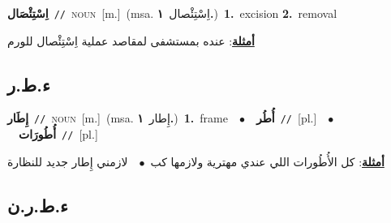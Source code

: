 \documentclass[10pt,a4paper,twoside]{article} %
\begin{document}
\begin{multicols}{2}
{\setlength\topsep{0pt}\textbf{\foreignlanguage{arabic}{اِسْتِئْصَال}}\ {\color{gray}\texttt{//}\color{black}}\ \textsc{noun}\ [m.]\ \color{gray}(msa. \foreignlanguage{arabic}{اِسْتِئْصال}~\foreignlanguage{arabic}{\textbf{١.}})\color{black}\ \textbf{1.}~excision  \textbf{2.}~removal\  \begin{flushright}\color{gray}\foreignlanguage{arabic}{\textbf{\underline{\foreignlanguage{arabic}{أمثلة}}}: عنده بمستشفى لمقاصد عملية اِسْتِئْصال للورم}\end{flushright}\color{black}} \vspace{2mm}

\vspace{-3mm}
\subsection*{\color{blue}\foreignlanguage{arabic}{ء.ط.ر}\color{blue}{}} 

{\setlength\topsep{0pt}\textbf{\foreignlanguage{arabic}{إِطَار}}\ {\color{gray}\texttt{//}\color{black}}\ \textsc{noun}\ [m.]\ \color{gray}(msa. \foreignlanguage{arabic}{إِطار}~\foreignlanguage{arabic}{\textbf{١.}})\color{black}\ \textbf{1.}~frame\ \ $\bullet$\ \ \setlength\topsep{0pt}\textbf{\foreignlanguage{arabic}{أُطُر}}\ {\color{gray}\texttt{//}\color{black}}\ [pl.]\ \ $\bullet$\ \ \setlength\topsep{0pt}\textbf{\foreignlanguage{arabic}{أُطُورَات}}\ {\color{gray}\texttt{//}\color{black}}\ [pl.]\  \begin{flushright}\color{gray}\foreignlanguage{arabic}{\textbf{\underline{\foreignlanguage{arabic}{أمثلة}}}: كل الأُطُورات اللي عندي مهترية ولازمها  كب\ $\bullet$\ \  لازمني إِطار جديد للنظارة}\end{flushright}\color{black}} \vspace{2mm}

\vspace{-3mm}
\subsection*{\color{blue}\foreignlanguage{arabic}{ء.ط.ر.ن}\color{blue}{ (ntws)}} 


\end{multicols}
\end{document}
